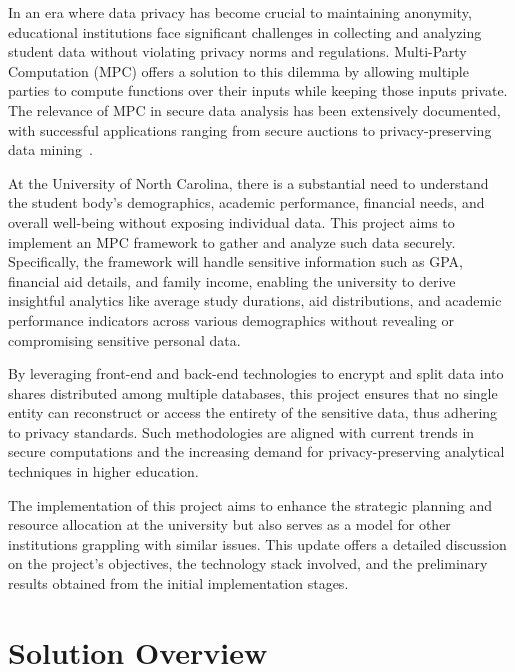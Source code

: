 \documentclass[conference]{IEEEtran}
\begin{document}
In an era where data privacy has become crucial to maintaining anonymity, educational institutions face significant challenges in collecting and analyzing student data without violating privacy norms and regulations. Multi-Party Computation (MPC) offers a solution to this dilemma by allowing multiple parties to compute functions over their inputs while keeping those inputs private. The relevance of MPC in secure data analysis has been extensively documented, with successful applications ranging from secure auctions to privacy-preserving data mining~\cite{MPC1}.

At the University of North Carolina, there is a substantial need to understand the student body's demographics, academic performance, financial needs, and overall well-being without exposing individual data. This project aims to implement an MPC framework to gather and analyze such data securely. Specifically, the framework will handle sensitive information such as GPA, financial aid details, and family income, enabling the university to derive insightful analytics like average study durations, aid distributions, and academic performance indicators across various demographics without revealing or compromising sensitive personal data.

By leveraging front-end and back-end technologies to encrypt and split data into shares distributed among multiple databases, this project ensures that no single entity can reconstruct or access the entirety of the sensitive data, thus adhering to privacy standards. Such methodologies are aligned with current trends in secure computations and the increasing demand for privacy-preserving analytical techniques in higher education.

The implementation of this project aims to enhance the strategic planning and resource allocation at the university but also serves as a model for other institutions grappling with similar issues. This update offers a detailed discussion on the project's objectives, the technology stack involved, and the preliminary results obtained from the initial implementation stages.

\section{Solution Overview}
\end{document}

